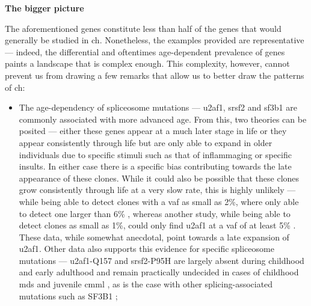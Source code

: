 \noindent \textbf{The bigger picture}

The aforementioned genes constitute less than half of the genes that would generally be studied in \ac{ch}. Nonetheless, the examples provided are representative --- indeed, the differential and oftentimes age-dependent prevalence of genes paints a landscape that is complex enough. This complexity, however, cannot prevent us from drawing a few remarks that allow us to better draw the patterns of \ac{ch}:

\begin{itemize}
    \item The age-dependency of spliceosome mutations --- \ac{u2af1}, \ac{srsf2} and \ac{sf3b1} are commonly associated with more advanced age. From this, two theories can be posited --- either these genes appear at a much later stage in life or they appear consistently through life but are only able to expand in older individuals due to specific stimuli such as that of inflammaging \cite{Franceschi2018-be} or specific insults. In either case there is a specific bias contributing towards the late appearance of these clones. While it could also be possible that these clones grow consistently through life at a very slow rate, this is highly unlikely --- while being able to detect clones with a \ac{vaf} as small as 2\%,  where only able to detect one larger than 6\%  \cite{Jaiswal2014-rl}, whereas another study, while being able to detect clones as small as 1\%, could only find \ac{u2af1} at a \ac{vaf} of at least 5\% \cite{Zehir2017-gh}. These data, while somewhat anecdotal, point towards a late expansion of \ac{u2af1}. Other data also supports this evidence for specific spliceosome mutations --- \ac{u2af1}-Q157 and \ac{srsf2}-P95H are largely absent during childhood and early adulthood and remain practically undecided in cases of childhood \ac{mds} and juvenile \ac{cmml} \cite{Kar2013-nw,Hirabayashi2012-jj}, as is the case with other splicing-associated mutations such as SF3B1 \cite{Lin2014-qr};

\end{itemize}
